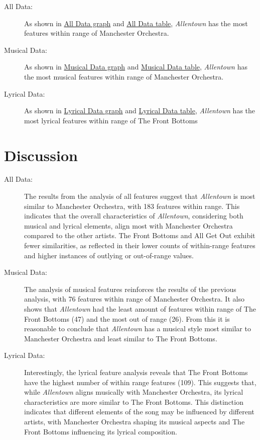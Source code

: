\documentclass{article}\usepackage[]{graphicx}\usepackage[]{xcolor}
\begin{document}
\begin{multicols}{2}
\begin{description}
  \item[All Data:] As shown in \hyperref[Graph]{All Data graph} and \hyperref[AllTable]{All Data table}, \emph{Allentown} has the most features within range of Manchester Orchestra.
  \item[Musical Data:] As shown in \hyperref[Graph]{Musical Data graph} and \hyperref[MusicalTable]{Musical Data table}, \emph{Allentown} has the most musical features within range of Manchester Orchestra.
  \item[Lyrical Data:] As shown in \hyperref[Graph]{Lyrical Data graph} and \hyperref[LyricalTable]{Lyrical Data table}, \emph{Allentown} has the most lyrical features within range of The Front Bottoms
\end{description}

\columnbreak

\section{Discussion}

\begin{description}
  \item[All Data:]{The results from the analysis of all features suggest that \emph{Allentown} is most similar to Manchester Orchestra, with 183 features within range. This indicates that the overall characteristics of \emph{Allentown}, considering both musical and lyrical elements, align most  with Manchester Orchestra compared to the other artists. The Front Bottoms and All Get Out exhibit fewer similarities, as reflected in their lower counts of within-range features and higher instances of outlying or out-of-range values.}

  \item[Musical Data:]{The analysis of musical features reinforces the results of the previous analysis, with 76 features within range of Manchester Orchestra. It also shows that \emph{Allentown} had the least amount of features within range of The Front Bottoms (47) and the most out of range (26). From this it is reasonable to conclude that \emph{Allentown} has a musical style most similar to Manchester Orchestra and least similar to The Front Bottoms.}
 
  \item[Lyrical Data:]{Interestingly, the lyrical feature analysis reveals that The Front Bottoms have the highest number of within range features (109). This suggests that, while \emph{Allentown} aligns musically with Manchester Orchestra, its lyrical characteristics are more similar to The Front Bottoms. This distinction indicates that different elements of the song may be influenced by different artists, with Manchester Orchestra shaping its musical aspects and The Front Bottoms influencing its lyrical composition.}
\end{description}



\end{multicols}
\end{document}
